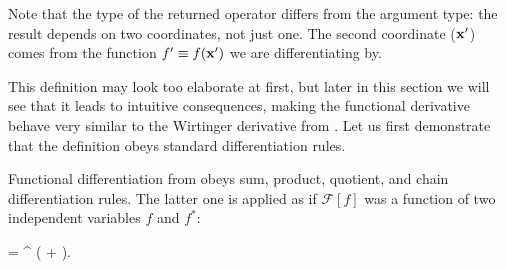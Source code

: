 Note that the type of the returned operator differs from the argument type: the result depends on two coordinates, not just one.
The second coordinate ($\mathbf{x}^\prime$) comes from the function $f^\prime \equiv f(\mathbf{x}^\prime)$ we are differentiating by.

This definition may look too elaborate at first, but later in this section we will see that it leads to intuitive consequences, making the functional derivative behave very similar to the Wirtinger derivative from .
Let us first demonstrate that the definition obeys standard differentiation rules.

\begin{theorem}
	Functional differentiation from  obeys sum, product, quotient, and chain differentiation rules.
	The latter one is applied as if $\mathcal{F}[f]$ was a function of two independent variables $f$ and $f^*$:
	\begin{eqn*}
			= \int \upd\xvec^{\prime\prime} \left(
				+ 
			\right).
	\end{eqn*}
\end{theorem}
